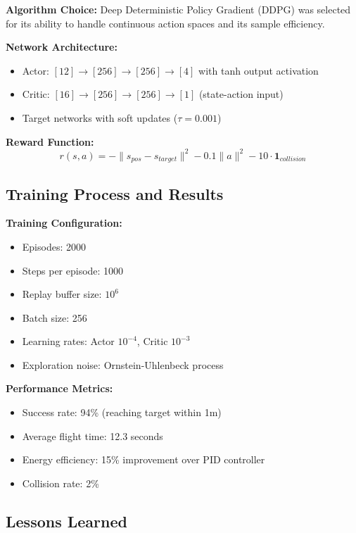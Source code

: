\textbf{Algorithm Choice:} Deep Deterministic Policy Gradient (DDPG) was selected for its ability to handle continuous action spaces and its sample efficiency.

\textbf{Network Architecture:}
\begin{itemize}
    \item Actor: $[12] \to [256] \to [256] \to [4]$ with tanh output activation
    \item Critic: $[16] \to [256] \to [256] \to [1]$ (state-action input)
    \item Target networks with soft updates ($\tau = 0.001$)
\end{itemize}

\textbf{Reward Function:}
\begin{equation}
r(s,a) = -\|s_{pos} - s_{target}\|^2 - 0.1\|a\|^2 - 10 \cdot \mathbf{1}_{collision}
\end{equation}

\subsection{Training Process and Results}

\textbf{Training Configuration:}
\begin{itemize}
    \item Episodes: 2000
    \item Steps per episode: 1000
    \item Replay buffer size: $10^6$
    \item Batch size: 256
    \item Learning rates: Actor $10^{-4}$, Critic $10^{-3}$
    \item Exploration noise: Ornstein-Uhlenbeck process
\end{itemize}

\textbf{Performance Metrics:}
\begin{itemize}
    \item Success rate: 94\% (reaching target within 1m)
    \item Average flight time: 12.3 seconds
    \item Energy efficiency: 15\% improvement over PID controller
    \item Collision rate: 2\%
\end{itemize}

\subsection{Lessons Learned}

